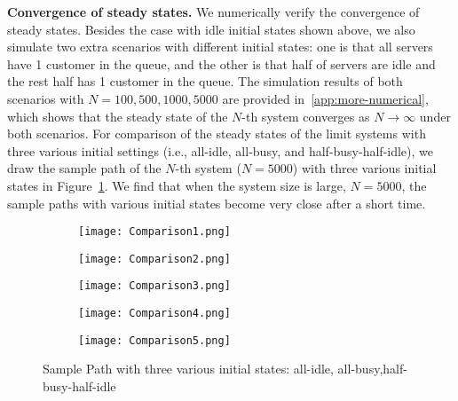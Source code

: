 \documentclass[11pt, reqno]{article}
\numberwithin{equation}{section}
\numberwithin{theorem}{section}
\begin{document}

\noindent
\textbf{Convergence of steady states.}
We numerically verify the convergence of steady states. Besides the case with idle initial states shown above, we also simulate two extra scenarios with different initial states: one is that all servers have 1 customer in the queue, and the other is that half of servers are idle and the rest half has 1 customer in the queue. The simulation results of both scenarios with $N=100,500,1000,5000$ are provided in~\ref{app:more-numerical}, which shows that the steady state of the $N$-th system converges as $N\rightarrow\infty$ under both scenarios. For comparison of the steady states of the limit systems with three various initial settings (i.e., all-idle, all-busy, and half-busy-half-idle), we draw the sample path of the $N$-th system ($N=5000$) with three various initial states in Figure~\ref{fig:comparison}. We find that when the system size is large, $N=5000$, the sample paths with various initial states become very close after a short time.
\begin{figure}[!htb]
     \centering
     \begin{subfigure}[b]{0.3\textwidth}
         \centering
         \texttt{[image: Comparison1.png]}
     \end{subfigure}
     \hfill
     \begin{subfigure}[b]{0.3\textwidth}
         \centering
         \texttt{[image: Comparison2.png]}
     \end{subfigure}
     \hfill
     \begin{subfigure}[b]{0.3\textwidth}
         \centering
         \texttt{[image: Comparison3.png]}
     \end{subfigure}
     \hfill
     \begin{subfigure}[b]{0.3\textwidth}
         \centering
         \texttt{[image: Comparison4.png]}
     \end{subfigure}
     \begin{subfigure}[b]{0.3\textwidth}
         \centering
         \texttt{[image: Comparison5.png]}
     \end{subfigure}
     \caption{Sample Path with three various initial states: all-idle, all-busy,half-busy-half-idle}
   \label{fig:comparison}
\end{figure}
\end{document}
